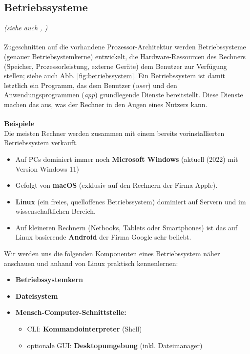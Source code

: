 \subsection{Betriebssysteme}
\textit{\small(siehe auch \cite[Kap. 2]{gumm2}, \cite[Kap. 6 ]{gumm3})}\\~\\
Zugeschnitten auf die vorhandene Prozessor-Architektur werden Betriebssysteme (genauer Betriebsystemkerne) entwickelt, die Hardware-Ressourcen des Rechners (Speicher, Prozessorleistung, externe Geräte) dem Benutzer zur Verfügung stellen; siehe auch Abb. \ref{fig:betriebssystem}.
Ein Betriebssystem ist damit letztlich ein Programm, das dem Benutzer (\textit{user}) und den Anwendungsprogrammen (\textit{app}) grundlegende Dienste bereitstellt. Diese Dienste  machen das aus, was der Rechner in den Augen eines Nutzers kann.\\
~\\
\textbf{Beispiele}\\
Die meisten Rechner werden zusammen mit einem bereits vorinstallierten Betriebssystem verkauft.
\begin{itemize}
	\item Auf PCs dominiert immer noch \textbf{Microsoft Windows} (aktuell (2022) mit Version Windows 11)
	\item Gefolgt von \textbf{macOS} (exklusiv auf den Rechnern der Firma Apple).
	\item \textbf{Linux} (ein freies, quelloffenes Betriebssystem) dominiert auf Servern und im wissenschaftlichen Bereich.
	\item Auf kleineren Rechnern (Netbooks, Tablets oder Smartphones) ist das auf Linux basierende \textbf{Android} der Firma Google sehr beliebt.
\end{itemize}
Wir werden uns die folgenden Komponenten eines Betriebssystem näher anschauen und anhand von Linux praktisch kennenlernen:
\begin{itemize}
	\item \textbf{Betriebssystemkern}
	\item \textbf{Dateisystem}
	\item \textbf{Mensch-Computer-Schnittstelle:}
	\begin{itemize}
		\item CLI: \textbf{Kommandointerpreter} (Shell)
		\item optionale GUI: \textbf{Desktopumgebung} (inkl. Dateimanager)
	\end{itemize}
\end{itemize}

